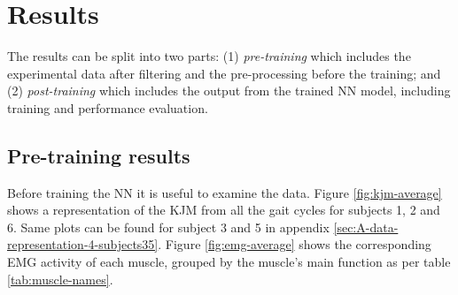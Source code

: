 \documentclass[../main.tex]{subfiles}
\begin{document}
\chapter{Results}
\label{sec:results}
The results can be split into two parts: (1) \textit{pre-training} which includes the experimental data after filtering and the pre-processing before the training; and (2) \textit{post-training} which includes the output from the trained \ac{NN} model, including training and performance evaluation.

\section{Pre-training results}
\label{sec:results_pre-training-results}
Before training the \ac{NN} it is useful to examine the data.
Figure \ref{fig:kjm-average} shows a representation of the \ac{KJM} from all the gait cycles for subjects 1, 2 and 6.
Same plots can be found for subject 3 and 5 in appendix \ref{sec:A-data-representation-4-subjects35}. 
Figure \ref{fig:emg-average} shows the corresponding \ac{EMG} activity of each muscle, grouped by the muscle's main function as per table \ref{tab:muscle-names}.
\end{document}
